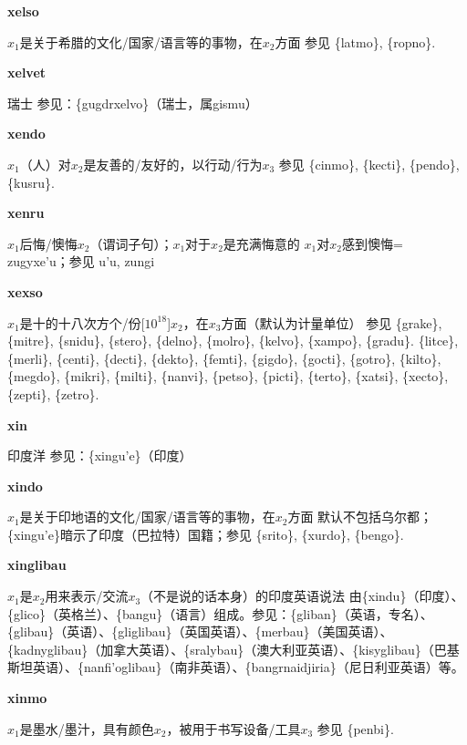 \documentclass[notitlepage,twocolumn,a4paper,10pt]{book}
\begin{document}
{\sffamily\bfseries xelso}\enspace {\ttfamily\bfseries[xes]}  $x_1$是关于希腊的文化\slash{}国家\slash{}语言等的事物，在$x_2$方面 \textemdash{} 参见 \{latmo\}, \{ropno\}.

{\sffamily\bfseries xelvet} 瑞士 \textemdash{} 参见：\{gugdrxelvo\}（瑞士，属gismu）

{\sffamily\bfseries xendo}\enspace {\ttfamily\bfseries[xed     xe'o]}  $x_1$（人）对$x_2$是友善的\slash{}友好的，以行动\slash{}行为$x_3$ \textemdash{} 参见 \{cinmo\}, \{kecti\}, \{pendo\}, \{kusru\}.

{\sffamily\bfseries xenru}\enspace {\ttfamily\bfseries[xer     xe'u]}  $x_1$后悔\slash{}懊悔$x_2$（谓词子句）；$x_1$对于$x_2$是充满悔意的 \textemdash{} $x_1$对$x_2$感到懊悔= {zugyxe'u}；参见 {u'u}, {zungi}

{\sffamily\bfseries xexso}\enspace {\ttfamily\bfseries[xex]}  $x_1$是十的十八次方个\slash{}份[$10^{18}$]$x_2$，在$x_3$方面（默认为计量单位） \textemdash{} 参见 \{grake\}, \{mitre\}, \{snidu\}, \{stero\}, \{delno\}, \{molro\}, \{kelvo\}, \{xampo\}, \{gradu\}. \{litce\}, \{merli\}, \{centi\}, \{decti\}, \{dekto\}, \{femti\}, \{gigdo\}, \{gocti\}, \{gotro\}, \{kilto\}, \{megdo\}, \{mikri\}, \{milti\}, \{nanvi\}, \{petso\}, \{picti\}, \{terto\}, \{xatsi\}, \{xecto\}, \{zepti\}, \{zetro\}.

{\sffamily\bfseries xin} 印度洋 \textemdash{} 参见：\{xingu'e\}（印度）

{\sffamily\bfseries xindo}\enspace {\ttfamily\bfseries[xin]}  $x_1$是关于印地语的文化\slash{}国家\slash{}语言等的事物，在$x_2$方面 \textemdash{} 默认不包括乌尔都；\{xingu'e\}暗示了印度（巴拉特）国籍；参见 \{srito\}, \{xurdo\}, \{bengo\}.

{\sffamily\bfseries xinglibau} $x_1$是$x_2$用来表示\slash{}交流$x_3$（不是说的话本身）的印度英语说法 \textemdash{} 由\{xindu\}（印度）、\{glico\}（英格兰）、\{bangu\}（语言）组成。参见：\{gliban\}（英语，专名）、\{glibau\}（英语）、\{gliglibau\}（英国英语）、\{merbau\}（美国英语）、\{kadnyglibau\}（加拿大英语）、\{sralybau\}（澳大利亚英语）、\{kisyglibau\}（巴基斯坦英语）、\{nanfi'oglibau\}（南非英语）、\{bangrnaidjiria\}（尼日利亚英语）等。

{\sffamily\bfseries xinmo}\enspace {\ttfamily\bfseries[xim]}  $x_1$是墨水\slash{}墨汁，具有颜色$x_2$，被用于书写设备\slash{}工具$x_3$ \textemdash{} 参见 \{penbi\}.
\end{document}
